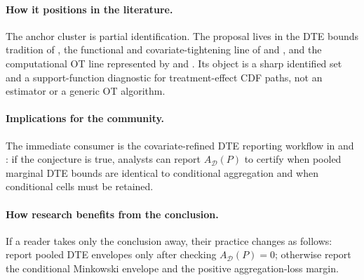 \documentclass[11pt]{article}
\theoremstyle{definition}
\theoremstyle{plain}
\theoremstyle{remark}
\begin{document}
\paragraph{How it positions in the literature.}
The anchor cluster is partial identification.  The proposal lives in the DTE bounds tradition of \citet{FanPark2010}, the functional and covariate-tightening line of \citet{FanGuerreZhu2017} and \citet{FirpoRidder2019}, and the computational OT line represented by \citet{Russell2021} and \citet{OberReynolds2023}.  Its object is a sharp identified set and a support-function diagnostic for treatment-effect CDF paths, not an estimator or a generic OT algorithm.

\paragraph{Implications for the community.}
The immediate consumer is the covariate-refined DTE reporting workflow in \citet{FanPark2010} and \citet{FanGuerreZhu2017}: if the conjecture is true, analysts can report \(A_{\mathcal D}(P)\) to certify when pooled marginal DTE bounds are identical to conditional aggregation and when conditional cells must be retained.

\paragraph{How research benefits from the conclusion.}
If a reader takes only the conclusion away, their practice changes as follows: report pooled DTE envelopes only after checking \(A_{\mathcal D}(P)=0\); otherwise report the conditional Minkowski envelope and the positive aggregation-loss margin.
\end{document}
